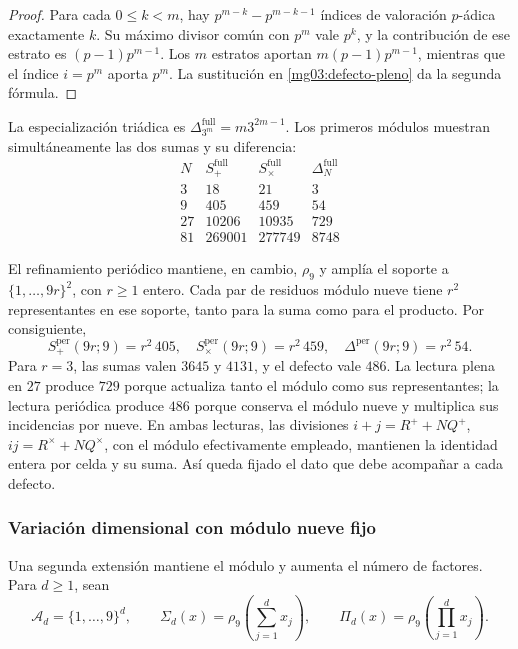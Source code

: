\begin{proof}
Para cada \(0\leq k<m\), hay
\(p^{m-k}-p^{m-k-1}\) índices de valoración \(p\)-ádica
exactamente \(k\). Su máximo divisor común con \(p^m\) vale
\(p^k\), y la contribución de ese estrato es
\((p-1)p^{m-1}\). Los \(m\) estratos aportan
\(m(p-1)p^{m-1}\), mientras que el índice \(i=p^m\) aporta
\(p^m\). La sustitución en \eqref{mg03:defecto-pleno} da la
segunda fórmula.
\end{proof}

La especialización triádica es
\(\Delta_{3^m}^{\mathrm{full}}=m3^{2m-1}\). Los primeros módulos
muestran simultáneamente las dos sumas y su diferencia:
\[
\begin{array}{c|r|r|r}
 N&S_+^{\mathrm{full}}&S_\times^{\mathrm{full}}&\Delta_N^{\mathrm{full}}\\\hline
 3&18&21&3\\
 9&405&459&54\\
 27&10206&10935&729\\
 81&269001&277749&8748
\end{array}
\]

El refinamiento periódico mantiene, en cambio, \(\rho_9\) y amplía
el soporte a \(\{1,\ldots,9r\}^2\), con \(r\geq1\) entero. Cada par de residuos módulo
nueve tiene \(r^2\) representantes en ese soporte, tanto para la
suma como para el producto. Por consiguiente,
\begin{equation}
 S_+^{\mathrm{per}}(9r;9)=r^2\,405,\quad
 S_\times^{\mathrm{per}}(9r;9)=r^2\,459,\quad
 \Delta^{\mathrm{per}}(9r;9)=r^2\,54.
 \label{mg03:periodico}
\end{equation}
Para \(r=3\), las sumas valen \(3645\) y \(4131\), y el defecto
vale \(486\). La lectura plena en \(27\) produce \(729\) porque
actualiza tanto el módulo como sus representantes; la lectura periódica
produce \(486\) porque conserva el módulo nueve y multiplica sus
incidencias por nueve. En ambas lecturas, las divisiones
\(i+j=R^++NQ^+\), \(ij=R^\times+NQ^\times\), con el módulo
efectivamente empleado, mantienen la identidad entera por celda y su
suma. Así queda fijado el dato que debe acompañar a cada defecto.

\subsubsection{Variación dimensional con módulo nueve fijo}
\label{mg03:dimension}

Una segunda extensión mantiene el módulo y aumenta el número de
factores. Para \(d\geq1\), sean
\[
 \mathcal A_d=\{1,\ldots,9\}^d,\qquad
 \Sigma_d(x)=\rho_9\!\left(\sum_{j=1}^d x_j\right),\qquad
 \Pi_d(x)=\rho_9\!\left(\prod_{j=1}^d x_j\right).
\]

